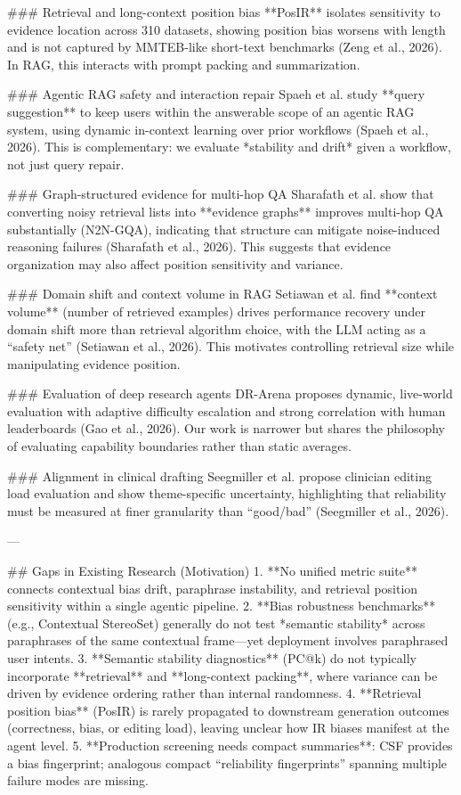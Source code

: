 ### Retrieval and long-context position bias
**PosIR** isolates sensitivity to evidence location across 310 datasets, showing position bias worsens with length and is not captured by MMTEB-like short-text benchmarks (Zeng et al., 2026). In RAG, this interacts with prompt packing and summarization.

### Agentic RAG safety and interaction repair
Spaeh et al. study **query suggestion** to keep users within the answerable scope of an agentic RAG system, using dynamic in-context learning over prior workflows (Spaeh et al., 2026). This is complementary: we evaluate *stability and drift* given a workflow, not just query repair.

### Graph-structured evidence for multi-hop QA
Sharafath et al. show that converting noisy retrieval lists into **evidence graphs** improves multi-hop QA substantially (N2N-GQA), indicating that structure can mitigate noise-induced reasoning failures (Sharafath et al., 2026). This suggests that evidence organization may also affect position sensitivity and variance.

### Domain shift and context volume in RAG
Setiawan et al. find **context volume** (number of retrieved examples) drives performance recovery under domain shift more than retrieval algorithm choice, with the LLM acting as a “safety net” (Setiawan et al., 2026). This motivates controlling retrieval size while manipulating evidence position.

### Evaluation of deep research agents
DR-Arena proposes dynamic, live-world evaluation with adaptive difficulty escalation and strong correlation with human leaderboards (Gao et al., 2026). Our work is narrower but shares the philosophy of evaluating capability boundaries rather than static averages.

### Alignment in clinical drafting
Seegmiller et al. propose clinician editing load evaluation and show theme-specific uncertainty, highlighting that reliability must be measured at finer granularity than “good/bad” (Seegmiller et al., 2026).

---

## Gaps in Existing Research (Motivation)
1. **No unified metric suite** connects contextual bias drift, paraphrase instability, and retrieval position sensitivity within a single agentic pipeline.
2. **Bias robustness benchmarks** (e.g., Contextual StereoSet) generally do not test *semantic stability* across paraphrases of the same contextual frame—yet deployment involves paraphrased user intents.
3. **Semantic stability diagnostics** (PC@k) do not typically incorporate **retrieval** and **long-context packing**, where variance can be driven by evidence ordering rather than internal randomness.
4. **Retrieval position bias** (PosIR) is rarely propagated to downstream generation outcomes (correctness, bias, or editing load), leaving unclear how IR biases manifest at the agent level.
5. **Production screening needs compact summaries**: CSF provides a bias fingerprint; analogous compact “reliability fingerprints” spanning multiple failure modes are missing.

